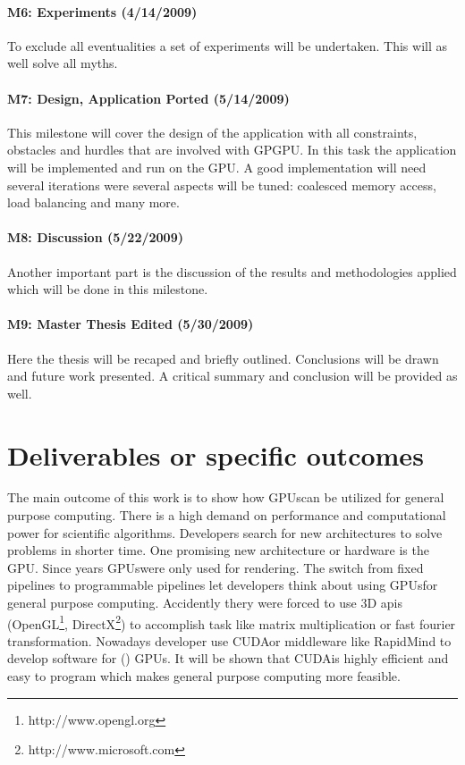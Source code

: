 \paragraph{M6: Experiments (4/14/2009)} %
\label{par:m6_experiments}
To exclude all eventualities a set of experiments will be undertaken. This will 
as well solve all myths.
\paragraph{M7: Design, Application Ported (5/14/2009)} %
\label{par:m7_design_application_ported}
This milestone will cover the design of the application with all constraints,
obstacles and hurdles that are involved with GPGPU. In this task the application
will be implemented and run on the GPU. A good implementation will need several
iterations were several aspects will be tuned: coalesced memory access, load
balancing and many more.
\paragraph{M8: Discussion (5/22/2009)} %
\label{par:m8_discussion}
Another important part is the discussion of the results and methodologies
applied which will be done in this milestone.

\paragraph{M9: Master Thesis Edited (5/30/2009)} %
\label{par:master_thesis_edited}
Here the thesis will be recaped and briefly outlined. Conclusions will be drawn
and future work presented. A critical summary and conclusion will be provided as
well. %

\section*{Deliverables or specific outcomes} 
\label{sub:deliverables_or_specific_outcomes} 
The main outcome of this work is to show how \glspl{GPU}can be utilized for general
purpose computing. There is a high demand on performance and computational power
for scientific algorithms. Developers search for new architectures to solve
problems in shorter time. One promising new architecture or hardware is the GPU.
Since years \glspl{GPU}were only used for rendering. The switch from fixed pipelines
to programmable pipelines let developers think about using \glspl{GPU}for general
purpose computing. Accidently thery were forced to use 3D apis
(OpenGL\footnote{http://www.opengl.org},
DirectX\footnote{http://www.microsoft.com}) to accomplish task like matrix
multiplication or fast fourier transformation. Nowadays developer use \gls{CUDA}or
middleware like RapidMind to develop software for ({}) GPUs. It will be
shown that \gls{CUDA}is highly efficient and easy to program which makes general
purpose computing more feasible.


